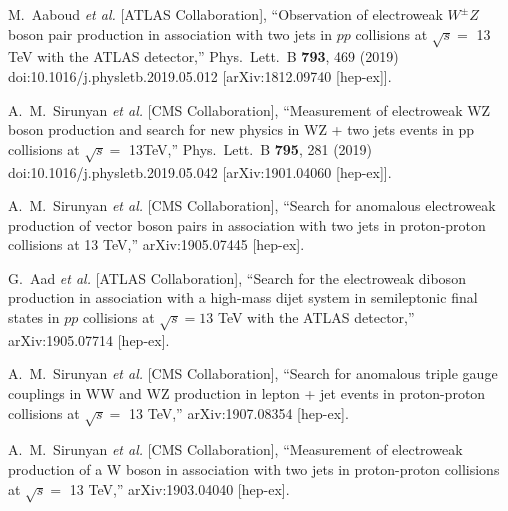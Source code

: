\begin{thebibliography}{99}
  M.~Aaboud {\it et al.} [ATLAS Collaboration],
  ``Observation of electroweak $W^{\pm}Z$ boson pair production in association with two jets in $pp$ collisions at $\sqrt{s} =$ 13 TeV with the ATLAS detector,''
  Phys.\ Lett.\ B {\bf 793}, 469 (2019)
  doi:10.1016/j.physletb.2019.05.012
  [arXiv:1812.09740 [hep-ex]].

  A.~M.~Sirunyan {\it et al.} [CMS Collaboration],
  ``Measurement of electroweak WZ boson production and search for new physics in WZ + two jets events in pp collisions at $\sqrt{s} =$ 13TeV,''
  Phys.\ Lett.\ B {\bf 795}, 281 (2019)
  doi:10.1016/j.physletb.2019.05.042
  [arXiv:1901.04060 [hep-ex]].

  A.~M.~Sirunyan {\it et al.} [CMS Collaboration],
  ``Search for anomalous electroweak production of vector boson pairs in association with two jets in proton-proton collisions at 13 TeV,''
  arXiv:1905.07445 [hep-ex].

  G.~Aad {\it et al.} [ATLAS Collaboration],
  ``Search for the electroweak diboson production in association with a high-mass dijet system in semileptonic final states in $pp$ collisions at $\sqrt{s}=13$ TeV with the ATLAS detector,''
  arXiv:1905.07714 [hep-ex].

  A.~M.~Sirunyan {\it et al.} [CMS Collaboration],
  ``Search for anomalous triple gauge couplings in WW and WZ production in lepton + jet events in proton-proton collisions at $\sqrt{s} =$ 13 TeV,''
  arXiv:1907.08354 [hep-ex].

  A.~M.~Sirunyan {\it et al.} [CMS Collaboration],
  ``Measurement of electroweak production of a W boson in association with two jets in proton-proton collisions at $\sqrt{s}=$ 13 TeV,''
  arXiv:1903.04040 [hep-ex].


\end{thebibliography}
